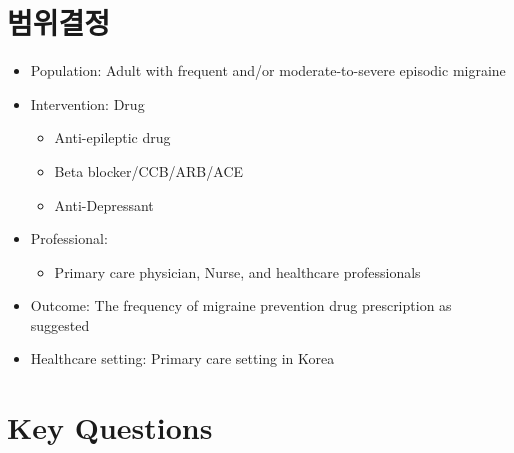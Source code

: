 \documentclass[]{book}
\providecommand{\tightlist}{%
  \setlength{\itemsep}{0pt}\setlength{\parskip}{0pt}}
\begin{document}
\hypertarget{section-20}{%
\section{범위결정}\label{section-20}}

\begin{itemize}
\item
  Population: Adult with frequent and/or moderate-to-severe episodic migraine
\item
  Intervention: Drug

  \begin{itemize}
  \tightlist
  \item
    Anti-epileptic drug
  \item
    Beta blocker/CCB/ARB/ACE
  \item
    Anti-Depressant
  \end{itemize}
\item
  Professional:

  \begin{itemize}
  \tightlist
  \item
    Primary care physician, Nurse, and healthcare professionals
  \end{itemize}
\item
  Outcome: The frequency of migraine prevention drug prescription as suggested
\item
  Healthcare setting: Primary care setting in Korea
\end{itemize}

\hypertarget{key-questions}{%
\section{Key Questions}\label{key-questions}}
\end{document}
